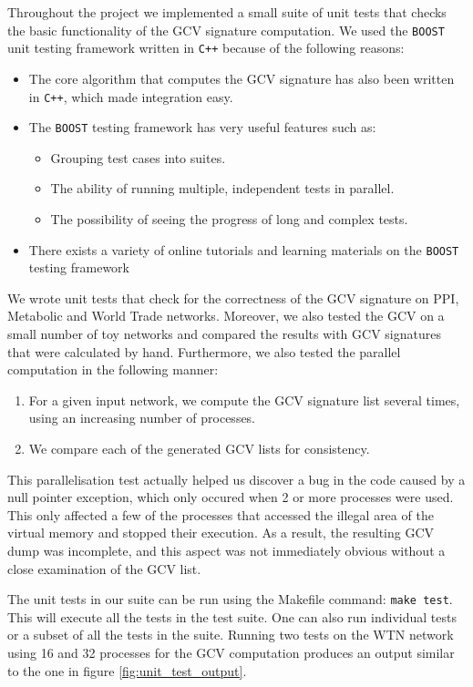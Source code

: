 Throughout the project we implemented a small suite of unit tests that checks the basic functionality of the GCV signature computation. We used the \lstinline|BOOST| unit testing framework written in \verb!C++! because of the following reasons:
\begin{itemize}
 \item The core algorithm that computes the GCV signature has also been written in \verb!C++!, which made integration easy.
 \item The \lstinline|BOOST| testing framework has very useful features such as:
 \begin{itemize}
  \item Grouping test cases into suites.
  \item The ability of running multiple, independent tests in parallel.
  \item The possibility of seeing the progress of long and complex tests.
 \end{itemize}
 \item There exists a variety of online tutorials and learning materials on the \lstinline|BOOST| testing framework
\end{itemize}

We wrote unit tests that check for the correctness of the GCV signature on PPI, Metabolic and World Trade networks. Moreover, we also tested the GCV on a small number of toy networks and compared the results with GCV signatures that were calculated by hand. Furthermore, we also tested the parallel computation in the following manner:
\begin{enumerate}
 \item For a given input network, we compute the GCV signature list several times, using an increasing number of processes.
 \item We compare each of the generated GCV lists for consistency. 
\end{enumerate}

This parallelisation test actually helped us discover a bug in the code caused by a null pointer exception, which only occured when 2 or more processes were used. This only affected a few of the processes that accessed the illegal area of the virtual memory and stopped their execution. As a result, the resulting GCV dump was incomplete, and this aspect was not immediately obvious without a close examination of the GCV list. 

The unit tests in our suite can be run using the Makefile command: \lstinline|make test|. This will execute all the tests in the test suite. One can also run individual tests or a subset of all the tests in the suite. Running two tests on the WTN network using 16 and 32 processes for the GCV computation produces an output similar to the one in figure \ref{fig:unit_test_output}.

